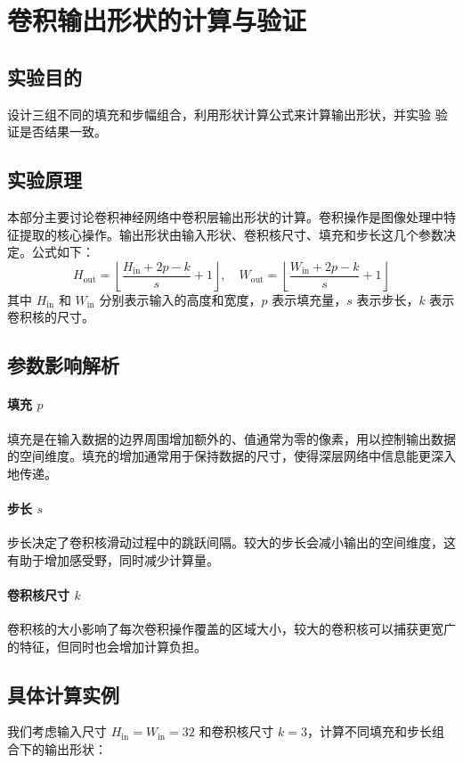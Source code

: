 \documentclass[a4paper,12pt]{article}
\begin{document}
\newpage
\section{卷积输出形状的计算与验证}
\subsection{实验目的}
设计三组不同的填充和步幅组合，利用形状计算公式来计算输出形状，并实验
验证是否结果一致。
\subsection{实验原理}
本部分主要讨论卷积神经网络中卷积层输出形状的计算。卷积操作是图像处理中特征提取的核心操作。输出形状由输入形状、卷积核尺寸、填充和步长这几个参数决定。公式如下：
\[
H_{\text{out}} = \left\lfloor \frac{H_{\text{in}} + 2p - k}{s} + 1 \right\rfloor, \quad
W_{\text{out}} = \left\lfloor \frac{W_{\text{in}} + 2p - k}{s} + 1 \right\rfloor
\]
其中 \( H_{\text{in}} \) 和 \( W_{\text{in}} \) 分别表示输入的高度和宽度，\( p \) 表示填充量，\( s \) 表示步长，\( k \) 表示卷积核的尺寸。

\subsection*{参数影响解析}
\paragraph{填充 \( p \)} 填充是在输入数据的边界周围增加额外的、值通常为零的像素，用以控制输出数据的空间维度。填充的增加通常用于保持数据的尺寸，使得深层网络中信息能更深入地传递。
\paragraph{步长 \( s \)} 步长决定了卷积核滑动过程中的跳跃间隔。较大的步长会减小输出的空间维度，这有助于增加感受野，同时减少计算量。
\paragraph{卷积核尺寸 \( k \)} 卷积核的大小影响了每次卷积操作覆盖的区域大小，较大的卷积核可以捕获更宽广的特征，但同时也会增加计算负担。

\subsection*{具体计算实例}
我们考虑输入尺寸 \( H_{\text{in}} = W_{\text{in}} = 32 \) 和卷积核尺寸 \( k = 3 \)，计算不同填充和步长组合下的输出形状：
\end{document}
